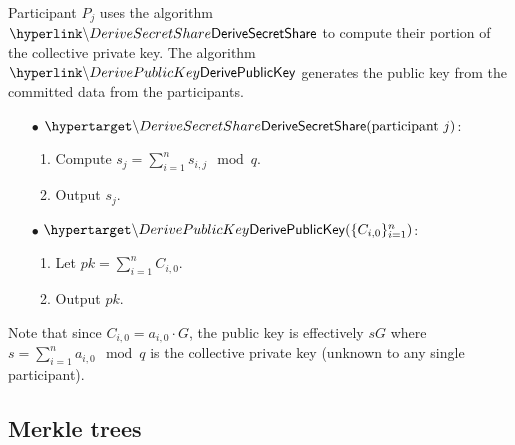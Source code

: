 %
\begin{mdframed}
Participant $P_j$ uses the algorithm $\hlget{\DeriveSecretShare}$ to compute their portion of the collective private key. The algorithm $\hlget{\DerivePublicKey}$ generates the public key from the committed data from the participants. \\

\noindent 
\begin{minipage}[t]{0.5\textwidth}
	\begin{itemize}
		\item[$\bullet$] $\hlset{\DeriveSecretShare}(\text{participant $j$})$:  \vspace{0.1cm}
		\begin{enumerate}
			\item Compute $s_j = \sum_{i = 1}^{n} s_{i, j} \mod q$.
			\item Output $s_j$.
		\end{enumerate}
	\end{itemize}
\end{minipage}
%
\begin{minipage}[t]{0.5\textwidth}
	\begin{itemize}
	\item[$\bullet$] $\hlset{\DerivePublicKey}(\{C_{i,0}\}_{i=1}^n)$:  \vspace{0.1cm}
	\begin{enumerate}
		\item Let $pk = \sum_{i=1}^n C_{i,0}$.
		\item Output $pk$.
	\end{enumerate}
	\end{itemize}
	Note that since $C_{i,0} = a_{i,0} \cdot G$, the public key is effectively $sG$ where $s = \sum_{i = 1}^n a_{i,0} \mod q$ is the collective private key (unknown to any single participant).
\end{minipage}
%
\end{mdframed}

\subsection{Merkle trees}
\label{sec:cryptographic-primitives:merkle-trees}


